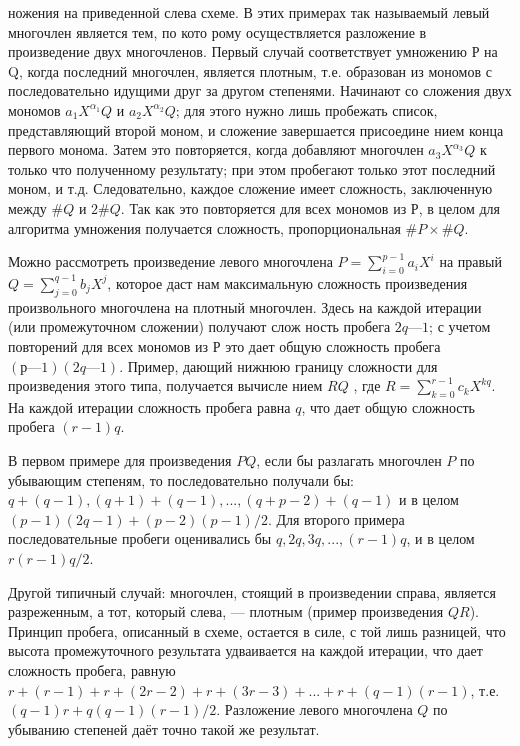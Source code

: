 \documentclass{mai_book}
\begin{document}
\noindent
ножения на приведенной сле­ва схеме. В этих примерах так называемый левый много­член является тем, по кото­
рому осуществляется разложе­ние в произведение двух мно­гочленов. Первый случай со­ответствует умножению Р на Q, когда последний многочлен, является плотным, т.е. образо­ван из мономов с последова­тельно идущими друг за другом степенями. Начинают со сложения двух
мономов $a_{1}X^{\alpha _1}Q$ и $a_{2}X^{\alpha _2}Q$; для этого нужно лишь пробежать список,
представляющий второй моном, и сложение завершается присоедине­
нием конца первого монома. Затем это повторяется, когда добавляют
многочлен $a_{3}X^{\alpha _3}Q$  к только что полученному результату; при этом пробегают только этот последний моном, и т.д. Следовательно, каждое
сложение имеет сложность, заключенную между $\#Q$ и $2\#Q$. Так как это
повторяется для всех мономов из $Р$, в целом для алгоритма умножения
получается сложность, пропорциональная $\#P \times \#Q$.
\par Можно рассмотреть произведение левого многочлена $ P =\sum^{p-1}_{i=0}a_{i}X^i$ на правый $Q =\sum^{q-1}_{j=0}b_{j}X^{j} $, которое даст нам максимальную сложность
произведения произвольного многочлена на плотный многочлен. Здесь
на каждой итерации (или промежуточном сложении) получают слож­
ность пробега $2q — 1$; с учетом повторений для всех мономов из $Р$ это дает общую сложность пробега $(р— 1)(2q — 1)$. Пример, дающий нижнюю
границу сложности для произведения этого типа, получается вычисле­
нием $RQ$ , где $R =\sum^{r-1}_{k=0}c_{k}X^{kq}$. На каждой итерации сложность пробега
равна $q$, что дает общую сложность пробега $(r - 1)q$.
\par В первом примере для произведения $PQ$, если бы разлагать мно­гочлен $P$ по убывающим степеням, то последовательно получали бы:$q + (q - 1), (q + 1) + (q - 1), ..., (q + p - 2) + (q - 1)$ и в целом $(p - 1)(2q - 1) + (p - 2)(p - 1)/2 $. Для второго примера последовательные пробеги
оценивались бы $q, 2q, 3q, ..., (r - 1)q$, и в целом $r(r - 1)q/2$.
\par Другой типичный случай: многочлен, стоящий в произведении спра­ва, является разреженным, а тот, который слева, — плотным (пример
произведения $QR$). Принцип пробега, описанный в схеме, остается в
силе, с той лишь разницей, что высота промежуточного результата
удваивается на каждой итерации, что дает сложность пробега, равную
$r + (r - 1) + r + (2r - 2) + r + (3r - 3) + ... + r + (q - 1)(r - 1)$, т.е. $(q - 1)r + q(q - 1)(r - 1)/2$. Разложение левого многочлена $Q$ по убыванию степеней даёт точно такой же результат.
 
 
 
\end{document}
